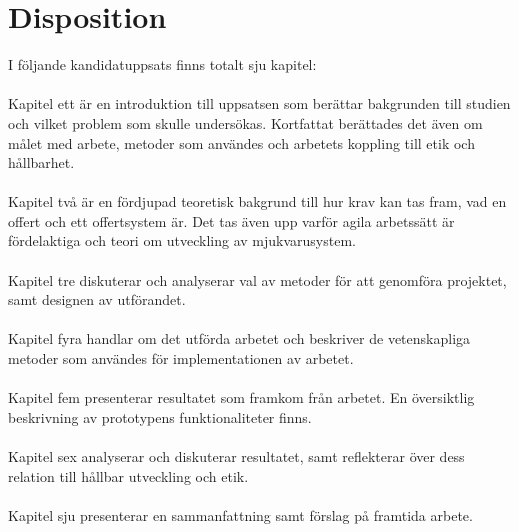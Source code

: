 \section{Disposition}
I följande kandidatuppsats finns totalt sju kapitel: 
\\\\
Kapitel ett är en introduktion till uppsatsen som berättar bakgrunden till studien och vilket problem som skulle undersökas. Kortfattat berättades det även om målet med arbete, metoder som användes och arbetets koppling till etik och hållbarhet.
\\\\
Kapitel två är en fördjupad teoretisk bakgrund till hur krav kan tas fram, vad en offert och ett offertsystem är. Det tas även upp varför agila arbetssätt är fördelaktiga och teori om utveckling av mjukvarusystem.
\\\\
Kapitel tre diskuterar och analyserar val av metoder för att genomföra projektet, samt designen av utförandet. 
\\\\
Kapitel fyra handlar om det utförda arbetet och beskriver de vetenskapliga metoder som användes för implementationen av arbetet. 
\\\\
Kapitel fem presenterar resultatet som framkom från arbetet. En översiktlig beskrivning av prototypens funktionaliteter finns.
\\\\
Kapitel sex analyserar och diskuterar resultatet, samt reflekterar över dess relation till hållbar utveckling och etik. 
\\\\ 
Kapitel sju presenterar en sammanfattning samt förslag på framtida arbete. 

